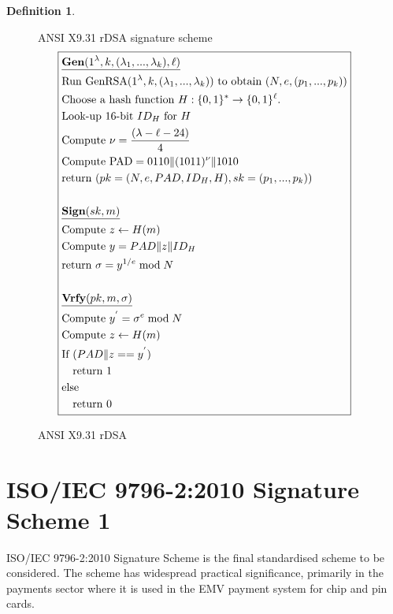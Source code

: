 \documentclass[]{final_report}
\theoremstyle{definition}
\newtheorem{definition}{Definition}[chapter]
\begin{document}
\begin{definition}
\begin{figure}[H]
\centering
\hfill ANSI X9.31 rDSA signature scheme\hfill\phantom{} 
\[
\boxed{
\begin{aligned}
&\underline{\textbf{\text{Gen}} (1^\lambda, k, (\lambda_{1},...,\lambda_{k}), \ell)} \\
&\text{Run GenRSA}(1^\lambda, k, (\lambda_{1},...,\lambda_{k})) \text{ to obtain } (N, e,  (p_{1},...,p_{k})) \\
&\text{Choose a hash function } H : \{0, 1\}^* \rightarrow \{0, 1\}^\ell. \\
&\text{Look-up } 16\text{-bit } ID_{H} \text{ for } H \\
&\text{Compute } \nu = \frac{(\lambda - \ell - 24)}{4} \\
&\text{Compute PAD} = 0110 \| (1011)^{\nu} \| 1010 \\
&\text{return } (pk = (N, e, PAD, ID_{H}, H), sk =  (p_{1},...,p_{k})) \\
\\
&\underline{\textbf{\text{Sign}} (sk, m)} \\
&\text{Compute } z \leftarrow H(m) \\
&\text{Compute } y = PAD  \| z \| ID_{H} \\
&\text{return } \sigma = y^{1/e} \bmod N \\
\\
&\underline{\textbf{\text{Vrfy}} (pk, m, \sigma)} \\
&\text{Compute } y^{'} = \sigma^{e} \bmod N \\
&\text{Compute } z \leftarrow H(m) \\
&\text{If } (PAD \| z == y^{'}) \\
&\quad \text{return } 1 \\
&\text{else} \\
&\quad \text{return } 0 
\end{aligned}
}
\]
\caption{ANSI X9.31 rDSA}
\label{fig:ansix931}
\end{figure}
\end{definition}


\section{ISO/IEC 9796-2:2010 Signature Scheme 1}
ISO/IEC 9796-2:2010 \cite{ISO/2010/9796-2-2010} Signature Scheme is the final standardised scheme to be considered. The scheme has widespread practical significance, primarily in the payments sector where it is used in the EMV payment system for chip and pin cards. 
\end{document}
